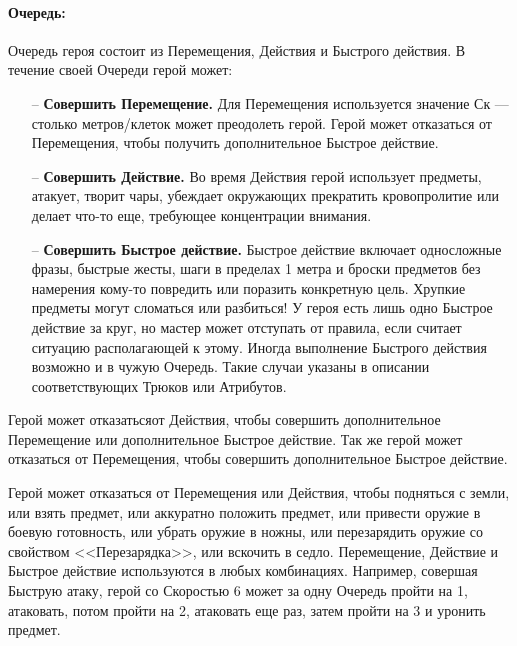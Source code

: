 \paragraph{Очередь:} Очередь героя состоит из Перемещения, Действия и Быстрого действия. В течение своей Очереди герой может:
\begin{itemize}
\item[--] \textbf{Совершить Перемещение.} Для Перемещения используется значение Ск — столько метров/клеток может преодолеть герой. Герой может отказаться от Перемещения, чтобы получить дополнительное Быстрое действие.
\item[--] \textbf{Совершить Действие.} Во время Действия герой использует предметы, атакует, творит чары, убеждает окружающих прекратить кровопролитие или делает что-то еще, требующее концентрации внимания.
\item[--] \textbf{Совершить Быстрое действие.} Быстрое действие включает односложные фразы, быстрые жесты, шаги в пределах 1 метра и броски предметов без намерения кому-то повредить или поразить конкретную цель. Хрупкие предметы могут сломаться или разбиться! У героя есть лишь одно Быстрое действие за круг, но мастер может отступать от правила, если считает ситуацию располагающей к этому. Иногда выполнение Быстрого действия возможно и в чужую Очередь. Такие случаи указаны в описании соответствующих Трюков или Атрибутов.
\end{itemize}
\begin{tcolorbox}
Герой может отказатьсяот Действия, чтобы совершить дополнительное Перемещение или дополнительное Быстрое действие.
\newline
Так же герой может отказаться от Перемещения, чтобы совершить дополнительное Быстрое действие.
\end{tcolorbox}
Герой может отказаться от Перемещения или Действия, чтобы подняться с земли, или взять предмет, или аккуратно положить предмет, или привести оружие в боевую готовность, или убрать оружие в ножны, или перезарядить оружие со свойством <<Перезарядка>>, или вскочить в седло.
\newline
Перемещение, Действие и Быстрое действие используются в любых комбинациях. Например, совершая Быструю атаку, герой со Скоростью 6 может за одну Очередь пройти на 1, атаковать, потом пройти на 2, атаковать еще раз, затем пройти на 3 и уронить предмет.


